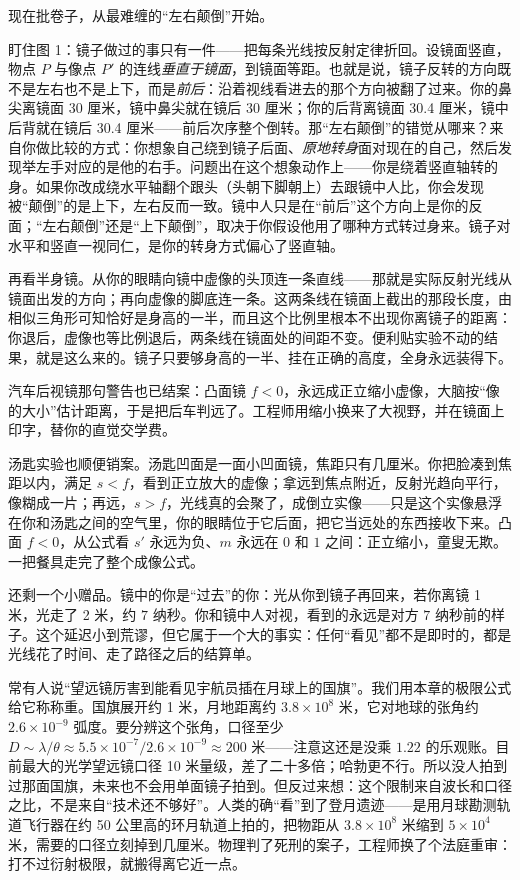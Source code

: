 \begin{mainline}


现在批卷子，从最难缠的“左右颠倒”开始。

盯住图 1：镜子做过的事只有一件——把每条光线按反射定律折回。设镜面竖直，物点 $P$ 与像点 $P'$ 的连线\emph{垂直于镜面}，到镜面等距。也就是说，镜子反转的方向既不是左右也不是上下，而是\emph{前后}：沿着视线看进去的那个方向被翻了过来。你的鼻尖离镜面 30 厘米，镜中鼻尖就在镜后 30 厘米；你的后背离镜面 30.4 厘米，镜中后背就在镜后 30.4 厘米——前后次序整个倒转。那“左右颠倒”的错觉从哪来？来自你做比较的方式：你想象自己绕到镜子后面、\emph{原地转身}面对现在的自己，然后发现举左手对应的是他的右手。问题出在这个想象动作上——你是绕着竖直轴转的身。如果你改成绕水平轴翻个跟头（头朝下脚朝上）去跟镜中人比，你会发现被“颠倒”的是上下，左右反而一致。镜中人只是在“前后”这个方向上是你的反面；“左右颠倒”还是“上下颠倒”，取决于你假设他用了哪种方式转过身来。镜子对水平和竖直一视同仁，是你的转身方式偏心了竖直轴。

再看半身镜。从你的眼睛向镜中虚像的头顶连一条直线——那就是实际反射光线从镜面出发的方向；再向虚像的脚底连一条。这两条线在镜面上截出的那段长度，由相似三角形可知恰好是身高的一半，而且这个比例里根本不出现你离镜子的距离：你退后，虚像也等比例退后，两条线在镜面处的间距不变。便利贴实验不动的结果，就是这么来的。镜子只要够身高的一半、挂在正确的高度，全身永远装得下。

汽车后视镜那句警告也已结案：凸面镜 $f<0$，永远成正立缩小虚像，大脑按“像的大小”估计距离，于是把后车判远了。工程师用缩小换来了大视野，并在镜面上印字，替你的直觉交学费。

汤匙实验也顺便销案。汤匙凹面是一面小凹面镜，焦距只有几厘米。你把脸凑到焦距以内，满足 $s<f$，看到正立放大的虚像；拿远到焦点附近，反射光趋向平行，像糊成一片；再远，$s>f$，光线真的会聚了，成倒立实像——只是这个实像悬浮在你和汤匙之间的空气里，你的眼睛位于它后面，把它当远处的东西接收下来。凸面 $f<0$，从公式看 $s'$ 永远为负、$m$ 永远在 $0$ 和 $1$ 之间：正立缩小，童叟无欺。一把餐具走完了整个成像公式。

还剩一个小赠品。镜中的你是“过去”的你：光从你到镜子再回来，若你离镜 1 米，光走了 2 米，约 $7$ 纳秒。你和镜中人对视，看到的永远是对方 $7$ 纳秒前的样子。这个延迟小到荒谬，但它属于一个大的事实：任何“看见”都不是即时的，都是光线花了时间、走了路径之后的结算单。


\begin{thought}[给月球上的国旗拍张照]

常有人说“望远镜厉害到能看见宇航员插在月球上的国旗”。我们用本章的极限公式给它称称重。国旗展开约 1 米，月地距离约 $3.8\times10^{8}$ 米，它对地球的张角约 $2.6\times10^{-9}$ 弧度。要分辨这个张角，口径至少 $D\sim\lambda/\theta\approx5.5\times10^{-7}/2.6\times10^{-9}\approx200$ 米——注意这还是没乘 $1.22$ 的乐观账。目前最大的光学望远镜口径 10 米量级，差了二十多倍；哈勃更不行。所以没人拍到过那面国旗，未来也不会用单面镜子拍到。但反过来想：这个限制来自波长和口径之比，不是来自“技术还不够好”。人类的确“看”到了登月遗迹——是用月球勘测轨道飞行器在约 50 公里高的环月轨道上拍的，把物距从 $3.8\times10^{8}$ 米缩到 $5\times10^{4}$ 米，需要的口径立刻掉到几厘米。物理判了死刑的案子，工程师换了个法庭重审：打不过衍射极限，就搬得离它近一点。


\end{thought}
\end{mainline}
